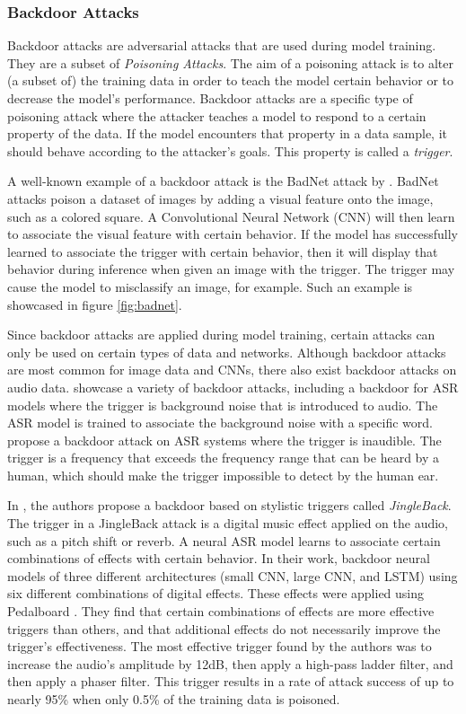 \documentclass[11pt]{article}
\begin{document}
\subsubsection{Backdoor Attacks}
Backdoor attacks are adversarial attacks that are used during model training.
They are a subset of \textit{Poisoning Attacks}.
The aim of a poisoning attack is to alter (a subset of) the training data in order to teach the model certain behavior or to decrease the model's performance.
Backdoor attacks are a specific type of poisoning attack where the attacker teaches a model to respond to a certain property of the data.
If the model encounters that property in a data sample, it should behave according to the attacker's goals.
This property is called a \textit{trigger}.

A well-known example of a backdoor attack is the BadNet attack by \citet{gu2019badnets}.
BadNet attacks poison a dataset of images by adding a visual feature onto the image, such as a colored square.
A Convolutional Neural Network (CNN) will then learn to associate the visual feature with certain behavior.
If the model has successfully learned to associate the trigger with certain behavior, then it will display that behavior during inference when given an image with the trigger.
The trigger may cause the model to misclassify an image, for example.
Such an example is showcased in figure \ref{fig:badnet}.

Since backdoor attacks are applied during model training, certain attacks can only be used on certain types of data and networks.
Although backdoor attacks are most common for image data and CNNs, there also exist backdoor attacks on audio data.
\citet{liu2018trojaning} showcase a variety of backdoor attacks, including a backdoor for ASR models where the trigger is background noise that is introduced to audio.
The ASR model is trained to associate the background noise with a specific word.
\citet{stefanos2022ultrasonic} propose a backdoor attack on ASR systems where the trigger is inaudible.
The trigger is a frequency that exceeds the frequency range that can be heard by a human, which should make the trigger impossible to detect by the human ear.

In \citet{stefanos2023jingleback}, the authors propose a backdoor based on stylistic triggers called \textit{JingleBack}.
The trigger in a JingleBack attack is a digital music effect applied on the audio, such as a pitch shift or reverb.
A neural ASR model learns to associate certain combinations of effects with certain behavior.
In their work, \citeauthor{stefanos2023jingleback} backdoor neural models of three different architectures (small CNN, large CNN, and LSTM) using six different combinations of digital effects.
These effects were applied using Pedalboard \citep{sobot2021pedalboard}.
They find that certain combinations of effects are more effective triggers than others, and that additional effects do not necessarily improve the trigger's effectiveness.
The most effective trigger found by the authors was to increase the audio's amplitude by 12dB, then apply a high-pass ladder filter, and then apply a phaser filter.
This trigger results in a rate of attack success of up to nearly 95\% when only 0.5\% of the training data is poisoned.
\end{document}
